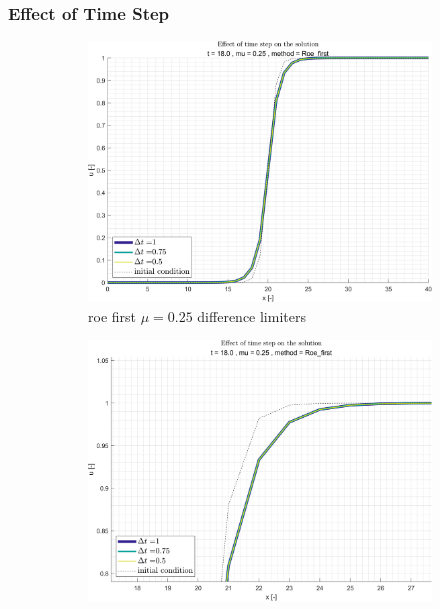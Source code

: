 \documentclass[11pt, a4paper]{article}
\begin{document}
\subsubsection{Effect of Time Step}
\begin{figure}[H]
    \centering
    \begin{subfigure}[c]{.49\textwidth}
        \centering
        \includegraphics[width=\textwidth]{images/grap8.png}
        \caption{roe first $\mu=0.25$ difference limiters}
        \label{fig:roe_first_general_mu0.25_A}
    \end{subfigure}
    \hfill
    \begin{subfigure}[c]{.49\textwidth}
        \centering
        \includegraphics[width=\textwidth]{images/grap8.1.png}

\end{subfigure}
\end{figure}
\end{document}

